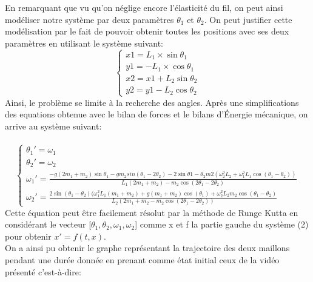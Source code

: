 \documentclass[a4paper,8pt,french,fleqn]{article}
\begin{document}
En remarquant que vu qu'on néglige encore l’élasticité du fil, on peut ainsi modéliser notre système par deux paramètres {$\theta_1$ et $\theta_2$}. On peut justifier cette modélisation par le fait de pouvoir obtenir toutes les positions avec ses deux paramètres en utilisant le système suivant:\\
\begin{equation}
 \begin{cases}
 x1 =  L_1 \times  \sin{\theta_1} \\
 y1 = - L_1 \times \cos{\theta_1} \\
 x2 = x1 + L_2 \sin{\theta_2} \\
 y2 = y1 - L_2 \cos{\theta_2} 
\end{cases}
\end{equation}
Ainsi, le problème se limite à la recherche des angles. Après une simplifications des equations obtenue avec le bilan de forces et le bilans d’Énergie mécanique, on arrive au système suivant:\\\\
\begin{equation}
\begin{cases}
 \theta_1' = \omega_1 \\\theta_2'= \omega_2
 \\
\omega_1' = \frac{-g(2 m_1 + m_2)\sin{\theta_1} - gm_2 sin(\theta_1- 2\theta_2)- 2\sin{\theta1 - \theta_2m2(\omega_{2}^2 L_2 + \omega_{1}^2 L_1\cos(\theta_1 - \theta_2))}}{ L_1 (2 m_1 + m_2) - m_2\cos(2 \theta_1 - 2 \theta_2)}\\

\omega_2' = \frac{2\sin(\theta_1-\theta_2)(\omega_{1}^{2}  L_1 (m_1 + m_2) + g(m_1 + m_2) \cos(\theta_1) + \omega_2^2 L_2 m_2 \cos(\theta_1 - \theta_2)}{
L_2 (2 m_1 + m_2 - m_2 \cos(2 \theta_1 - 2 \theta_2))} 
\end{cases}
\end{equation}
Cette équation peut être facilement résolut par la méthode de Runge Kutta en considérant le vecteur [$\theta_1,\theta_2,\omega_1,\omega_2$] comme x et f la partie gauche du système (2) pour obtenir $x'=f(t,x)$.\\
On a ainsi pu obtenir le graphe représentant la trajectoire des deux maillons pendant une durée donnée en prenant comme état initial ceux de la vidéo présenté c'est-à-dire:\\
\end{document}
